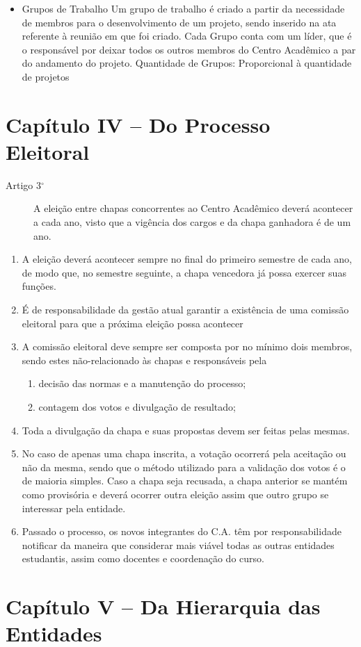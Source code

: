 \documentclass[12pt]{article}
\begin{document}
\begin{itemize}
    \item Grupos de Trabalho
        \subitem Um grupo de trabalho é criado a partir da necessidade de
        membros para o desenvolvimento de um projeto, sendo inserido na ata
        referente à reunião em que foi criado. Cada Grupo conta com um
        líder, que é o responsável por deixar todos os outros membros do Centro
        Acadêmico a par do andamento do projeto.
        \subitem  Quantidade de Grupos: Proporcional à quantidade de projetos
\end{itemize}


\section{Capítulo IV -- Do Processo Eleitoral}
\begin{description}
    \item[Artigo 3$^\circ$] A eleição entre chapas concorrentes ao Centro
        Acadêmico deverá acontecer a cada ano, visto que a vigência dos cargos
        e da chapa ganhadora é de um ano.
\end{description}
\begin{enumerate}[label= \S\,\arabic*$^\circ$]
    \item A eleição deverá acontecer sempre no final do primeiro semestre de
        cada ano, de modo que, no semestre seguinte, a chapa vencedora já possa
        exercer suas funções.
    \item É de responsabilidade da gestão atual garantir a existência de uma
        comissão eleitoral para que a próxima eleição possa acontecer
    \item A comissão eleitoral deve sempre ser composta por no mínimo dois
        membros, sendo estes não-relacionado às chapas e responsáveis pela
        \begin{enumerate}[label=\alph*)]
            \item decisão das normas e a manutenção do processo;
            \item contagem dos votos e divulgação de resultado;
        \end{enumerate}
    \item Toda a divulgação da chapa e suas propostas devem ser feitas pelas
        mesmas.
    \item No caso de apenas uma chapa inscrita, a votação ocorrerá pela
        aceitação ou não da mesma, sendo que o método utilizado para a
        validação dos votos é o de maioria simples. Caso a chapa seja recusada,
        a chapa anterior se mantém como provisória e deverá ocorrer outra
        eleição assim que outro grupo se interessar pela entidade.
    \item Passado o processo, os novos integrantes do C.A. têm por
        responsabilidade notificar da maneira que considerar mais viável todas as outras entidades estudantis, assim
        como docentes e coordenação do curso.
\end{enumerate}

\section{Capítulo V -- Da Hierarquia das Entidades}
\end{document}
